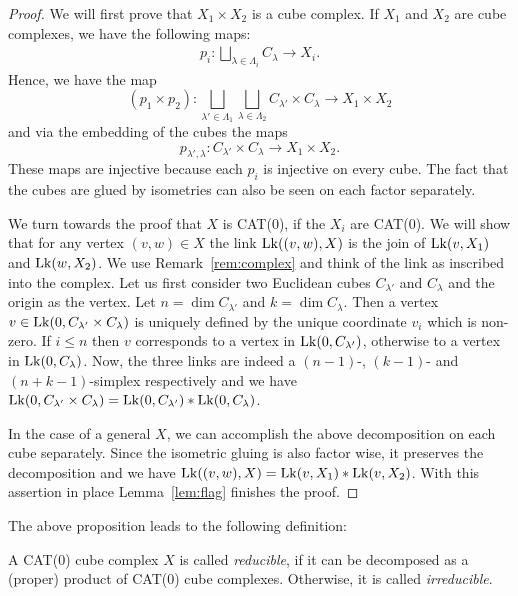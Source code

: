 \begin{proof}
  We will first prove that \(X_1 \times X_2\) is a cube complex. If \(X_1\) and \(X_2\) are cube complexes, we have the following maps:
  \begin{align*}
    p_i \colon \bigsqcup_{\lambda \in \Lambda_i} C_\lambda \to X_i.
  \end{align*}
  Hence, we have the map
  \[
    (p_1 \times p_2) \colon \bigsqcup_{\lambda' \in \Lambda_1} \bigsqcup_{\lambda \in \Lambda_2} C_{\lambda'} \times C_{\lambda} \to X_1 \times X_2
  \]
  and via the embedding of the cubes the maps
  \[
    p_{\lambda', \lambda} \colon C_{\lambda'} \times C_{\lambda} \to X_1 \times X_2.
  \]
  These maps are injective because each \(p_i\) is injective on every cube. The fact that the cubes are glued by isometries can also be seen on each factor separately.

  We turn towards the proof that \(X\) is CAT(0), if the \(X_i\) are CAT(0). We will show that for any vertex \((v,w) \in X\) the link \(\operatorname{Lk}((v,w), X)\) is the join of \(\operatorname{Lk}(v, X_1)\) and \(\operatorname{Lk}(w,X_2)\). We use Remark~\ref{rem:complex} and think of the link as inscribed into the complex. Let us first consider two Euclidean cubes \(C_{\lambda'}\) and \(C_\lambda\) and the origin as the vertex. Let \(n = \dim C_{\lambda'}\) and \(k = \dim C_\lambda\). Then a vertex \(v \in \operatorname{Lk}(0, C_{\lambda'} \times C_{\lambda})\) is uniquely defined by the unique coordinate \(v_i\) which is non-zero. If \(i \leq n\) then \(v\) corresponds to a vertex in \(\operatorname{Lk}(0, C_{\lambda'})\), otherwise to a vertex in \(\operatorname{Lk}(0, C_\lambda)\). Now, the three links are indeed a \((n-1)\)-, \((k-1)\)- and \((n+k-1)\)-simplex respectively and we have \(\operatorname{Lk}(0, C_{\lambda'} \times C_\lambda) = \operatorname{Lk}(0, C_{\lambda'}) \ast \operatorname{Lk}(0, C_{\lambda})\).

  In the case of a general \(X\), we can accomplish the above decomposition on each cube separately. Since the isometric gluing is also factor wise, it preserves the decomposition and we have \(\operatorname{Lk}((v,w), X) = \operatorname{Lk}(v, X_1) \ast \operatorname{Lk}(v, X_2)\). With this assertion in place Lemma~\ref{lem:flag} finishes the proof.
\end{proof}

The above proposition leads to the following definition:

\begin{defin}
  A CAT(0) cube complex \(X\) is called \emph{reducible}, if it can be decomposed as a (proper) product of CAT(0) cube complexes. Otherwise, it is called \emph{irreducible}.
\end{defin}

